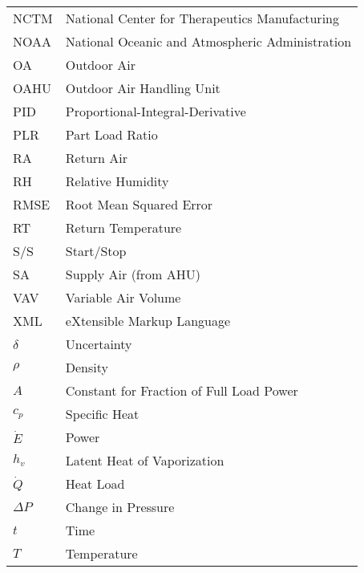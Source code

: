 \begin{longtable}{ll}
NCTM         & National Center for Therapeutics Manufacturing            \\
NOAA         & National Oceanic and Atmospheric Administration           \\
OA           & Outdoor Air                                               \\
OAHU         & Outdoor Air Handling Unit                                 \\
PID          & Proportional-Integral-Derivative                          \\
PLR          & Part Load Ratio                                           \\
RA           & Return Air                                                \\
RH           & Relative Humidity                                         \\
RMSE         & Root Mean Squared Error                                   \\
RT           & Return Temperature                                        \\
S/S          & Start/Stop                                                \\
SA           & Supply Air (from AHU)                                     \\
VAV          & Variable Air Volume                                       \\
XML          & eXtensible Markup Language                                \\
\(\delta\)   & Uncertainty                                               \\
\(\rho\)     & Density                                                   \\
\(A\)        & Constant for Fraction of Full Load Power                  \\
\(c_{p}\)    & Specific Heat                                             \\
\(\dot{E}\)  & Power                                                     \\
\(h_{v}\)    & Latent Heat of Vaporization                               \\
\( \dot{Q}\) & Heat Load                                                 \\
\(\Delta P\) & Change in Pressure                                        \\
\(t\)        & Time\tabularnewline
\(T\)        & Temperature\tabularnewline

\end{longtable}
